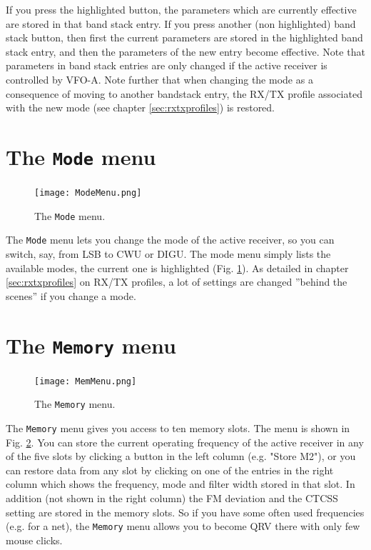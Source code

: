\documentclass[12pt]{book}
\def\bltt#1{\texttt{\color{blue}#1}}
\begin{document}
If you press the highlighted button, the parameters which are currently effective are stored in that band stack
entry. If you press another (non highlighted) band stack button, then first the current
parameters are stored in the highlighted band stack entry, and then the parameters of the
new entry become effective. Note that parameters in band stack entries are only changed if the active
receiver is controlled by VFO-A. Note further that when changing the mode as a consequence of
moving to another bandstack entry, the RX/TX profile associated with the new mode (see chapter \ref{sec:rxtxprofiles})
is restored.

\section{The \texttt{Mode} menu}
\begin{figure}[ht]
\center
\texttt{[image: ModeMenu.png]}
\caption{The \bltt{Mode} menu.}
\label{fig:ModeMenu}
\end{figure}

The \bltt{Mode} menu lets you change the mode of the active receiver, so you can switch,
say, from LSB to CWU or DIGU. The mode menu simply lists the available modes, the current
one is highlighted (Fig. \ref{fig:ModeMenu}). As detailed in chapter \ref{sec:rxtxprofiles}
on RX/TX profiles,
a lot of settings are changed ''behind the scenes'' if you change a mode.

\section{The \texttt{Memory}  menu}
\label{sec:memmenu}

\begin{figure}[ht]
\center
\texttt{[image: MemMenu.png]}
\caption{The \bltt{Memory} menu.}
\label{fig:MemMenu}
\end{figure}

The \bltt{Memory} menu gives you access to ten memory slots. The menu is shown in Fig. \ref{fig:MemMenu}.
You can store the current
operating frequency  of the active receiver in any of the five slots by clicking a
button in the left column (e.g. "Store M2"), or you can restore
data from any slot by clicking on one of the entries in the right column
which shows the frequency, mode and filter width stored in that slot.
In addition (not shown in the right column) the FM deviation and the CTCSS setting are stored
in the memory slots.
So if you have some often used frequencies (e.g. for a net), the
\bltt{Memory} menu allows you to become QRV there with only few mouse clicks.
\end{document}
